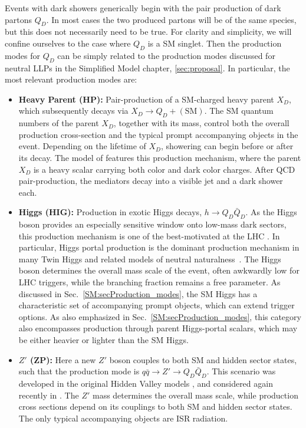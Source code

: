 Events with dark showers generically begin with the pair production of dark
partons $Q_D$.  In most cases the two produced partons will be of the
same species, but this does not necessarily need to be true.
For clarity and simplicity, we will confine ourselves to the
case where $Q_D$ is a SM singlet.
Then the production modes for $Q_D$ can be simply related to the
production modes discussed for neutral LLPs in the Simplified Model
chapter, \ref{sec:proposal}.  In particular, the most relevant production modes are:
%
\begin{itemize}

\item {\bf Heavy Parent (HP):} Pair-production of a SM-charged heavy
  parent $X_D$, which subsequently decays via $X_D\to
  Q_D+\mathrm{(SM)}$.  The SM quantum numbers of the parent $X_D$, together with its mass,
  control both the overall production cross-section and the typical prompt
  accompanying  objects in the event. Depending on the lifetime of $X_D$, showering can begin before or after its decay. 
  The model of \cite{Schwaller:2015gea} features this production
  mechanism, 
  where the parent $X_D$ is a heavy scalar carrying both color and
  dark color charges. After QCD pair-production, the mediators decay
  into a visible jet and a dark shower each.


\item {\bf Higgs (HIG):} Production in exotic Higgs decays, $h\to
  Q_D\bar Q_D$.  
%
 As the Higgs boson provides an especially sensitive window onto low-mass dark sectors, this production mechanism is one of the best-motivated at the LHC \cite{Strassler:2006ri,Curtin:2013fra}. In particular, Higgs portal production is the dominant production mechanism in many Twin Higgs and
  related models of neutral naturalness~\cite{Craig:2015pha,Craig:2016kue,Curtin:2015fna}.  The Higgs boson determines the overall mass scale of the event, often
  awkwardly low for LHC triggers, while the branching fraction remains a free parameter.  As discussed in Sec.~\ref{SM:secProduction_modes}, the SM Higgs has a characteristic set of accompanying prompt
  objects, which can extend trigger options.
%
As also emphasized in Sec.~\ref{SM:secProduction_modes}, this category also encompasses production through parent Higgs-portal scalars, which may be either heavier or lighter than the SM Higgs.

\item {\bf $Z'$ (ZP):} Here a new $Z'$ boson couples to both SM and hidden sector
  states, such that the production mode is $q\bar q \to Z'\to
 Q_D\bar Q_D$. This scenario was developed in the original Hidden Valley models \cite{Strassler:2006im,Han:2007ae}, and considered again recently in \cite{Cohen:2015toa}.  The $Z'$ mass determines the overall mass scale, while production cross sections depend on its couplings to both SM and hidden sector states.  The only typical accompanying objects are ISR radiation.


\end{itemize}
